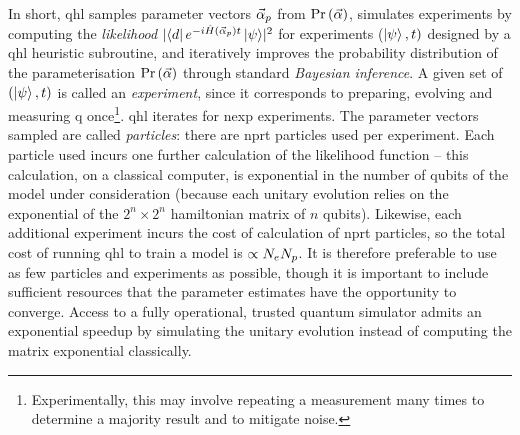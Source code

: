 In short, \gls{qhl} samples parameter vectors $\vec{\alpha}_p$ from $\Pr\left(\vec{\alpha}\right)$, 
    simulates \glspl{experiment} by computing the \emph{likelihood} $\lvert \bra{d} e^{-i \hat{H}(\vec{\alpha}_p)t} \ket{\psi} \rvert^2$
    for \glspl{experiment} ($\ket{\psi}, t)$ designed by a \gls{qhl} heuristic subroutine, 
    and iteratively improves the probability distribution of the parameterisation $\Pr\left(\vec{\alpha}\right)$ 
    through standard \emph{Bayesian inference}. 
A given set of $(\ket{\psi}, t)$ is called an \emph{experiment}, since it corresponds to preparing, evolving and measuring \gls{q} 
once\footnote{Experimentally, this may involve repeating a measurement many times to determine a majority result and to mitigate noise.}. 
\gls{qhl} iterates for \gls{nexp} \glspl{experiment}. 
The parameter vectors sampled are called \emph{\glspl{particle}}: there are \gls{nprt} \glspl{particle} used per experiment. 
Each \gls{particle} used incurs one further calculation of the \gls{likelihood} function -- 
    this calculation, on a classical computer, is exponential in the number of qubits of the model under consideration
    (because each unitary evolution relies on the exponential of the $2^n \times 2^n$ \gls{hamiltonian} matrix of $n$ qubits). 
Likewise, each additional \gls{experiment} incurs the cost of calculation of \gls{nprt} \glspl{particle}, 
    so the total cost of running \gls{qhl} to train a model is $\propto N_e N_p$.
It is therefore preferable to use as few \glspl{particle} and \glspl{experiment} as possible, 
    though it is important to include sufficient resources that the parameter estimates have the opportunity to converge. 
Access to a fully operational, trusted quantum simulator admits an exponential 
    speedup by simulating the unitary evolution instead of computing the matrix exponential classically.
\par 

